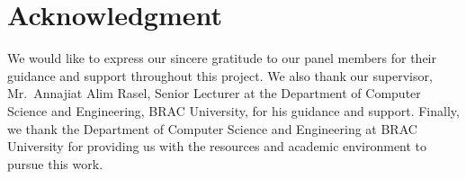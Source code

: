 \documentclass[12pt,a4paper]{report}
\begin{document}
\chapter*{Acknowledgment}
{}

We would like to express our sincere gratitude to our panel members for their guidance and support throughout this project. We also thank our supervisor, Mr.\ Annajiat Alim Rasel, Senior Lecturer at the Department of Computer Science and Engineering, BRAC University, for his guidance and support. Finally, we thank the Department of Computer Science and Engineering at BRAC University for providing us with the resources and academic environment to pursue this work.

\newpage
\singlespacing
\setcounter{page}{1}
\tableofcontents
\newpage
{}
{}
\listoftables
\newpage
{}
{}
\listoffigures
\newpage
\end{document}
